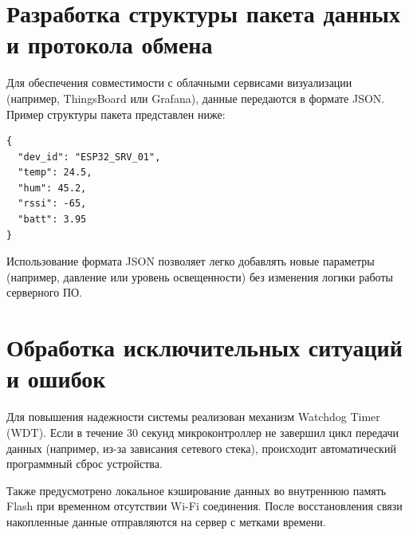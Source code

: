\section{Разработка структуры пакета данных и протокола обмена}

Для обеспечения совместимости с облачными сервисами визуализации (например, ThingsBoard или Grafana), данные передаются в формате JSON. Пример структуры пакета представлен ниже:

\begin{verbatim}
{
  "dev_id": "ESP32_SRV_01",
  "temp": 24.5,
  "hum": 45.2,
  "rssi": -65,
  "batt": 3.95
}
\end{verbatim}

Использование формата JSON позволяет легко добавлять новые параметры (например, давление или уровень освещенности) без изменения логики работы серверного ПО.

\section{Обработка исключительных ситуаций и ошибок}

Для повышения надежности системы реализован механизм Watchdog Timer (WDT). Если в течение 30 секунд микроконтроллер не завершил цикл передачи данных (например, из-за зависания сетевого стека), происходит автоматический программный сброс устройства.

Также предусмотрено локальное кэширование данных во внутреннюю память Flash при временном отсутствии Wi-Fi соединения. После восстановления связи накопленные данные отправляются на сервер с метками времени.

\newpage